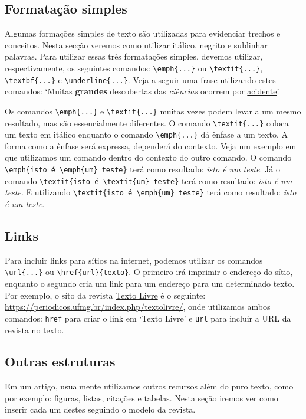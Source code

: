 \documentclass{textolivre}
\begin{document}
\subsection{Formatação simples}\label{sec-format-simple}
Algumas formações simples de texto são utilizadas para evidenciar trechos e conceitos.
Nesta secção veremos como utilizar itálico, negrito e sublinhar palavras. 
Para utilizar essas três formatações simples, devemos utilizar, respectivamente, os seguintes
comandos: \verb|\emph{...}| ou \verb|\textit{...}|, \verb|\textbf{...}| e \verb|\underline{...}|.
Veja a seguir uma frase utilizando estes comandos: 
`Muitas \textbf{grandes} descobertas das \textit{ciências} ocorrem por \underline{acidente}'.

Os comandos \verb|\emph{...}| e \verb|\textit{...}| muitas vezes podem levar a um mesmo resultado,
mas são essencialmente diferentes. O comando \verb|\textit{...}| coloca um texto em itálico enquanto
o comando \verb|\emph{...}| dá ênfase a um texto. A forma como a ênfase será expressa, dependerá do contexto.
Veja um exemplo em que utilizamos um comando dentro do contexto do outro comando.
O comando \verb|\emph{isto é \emph{um} teste}| terá como resultado: \emph{isto é \emph{um} teste}.
Já o comando \verb|\textit{isto é \textit{um} teste}| terá como resultado: \textit{isto é \textit{um} teste}.
E utilizando \verb|\textit{isto é \emph{um} teste}| terá como resultado: \textit{isto é \emph{um} teste}.



\subsection{Links}\label{sec-links}
Para incluir links para sítios na internet, podemos utilizar os comandos \verb|\url{...}|
ou \verb|\href{url}{texto}|. O primeiro irá imprimir o endereço do sítio,
enquanto o segundo cria um link para um endereço para um determinado texto.
Por exemplo, o síto da revista \href{https://periodicos.ufmg.br/index.php/textolivre/}{Texto Livre} é o seguinte:
\url{https://periodicos.ufmg.br/index.php/textolivre/},
onde utilizamos ambos comandos: \verb|href| para criar o link em `Texto Livre' e \verb|url| para incluir
a URL da revista no texto.




\subsection{Outras estruturas}\label{sec-outras-estr}
Em um artigo, usualmente utilizamos outros recursos além do puro texto, como por exemplo:
figuras, listas, citações e tabelas. Nesta seção iremos ver como inserir cada um destes
seguindo o modelo da revista.
\end{document}
